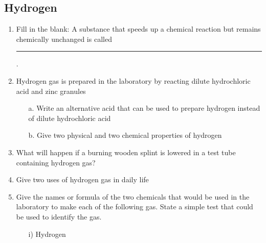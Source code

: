 \subsection{Hydrogen}

\begin{enumerate}
	\item Fill in the blank: A substance that speeds up a chemical reaction but remains chemically unchanged is called \rule{1.5cm}{0.15mm}.
	
	\item Hydrogen gas is prepared in the laboratory by reacting dilute hydrochloric acid and zinc granules
	\begin{enumerate}[topsep=0ex,itemsep=0ex,partopsep=1ex,parsep=1ex]
		\item[a.] Write an alternative acid that can be used to prepare hydrogen instead of dilute hydrochloric acid
		\item[b.] Give two physical and two chemical properties of hydrogen
	\end{enumerate}
	
	\item What will happen if a burning wooden splint is lowered in a test tube containing hydrogen gas?
	
	\item Give two uses of hydrogen gas in daily life
	
	\item Give the names or formula of the two chemicals that would be used in the laboratory to make each of the following gas. State a simple test that could be used to identify the gas. 
	\begin{enumerate}
		\item[i)] Hydrogen
	\end{enumerate}

\end{enumerate}














